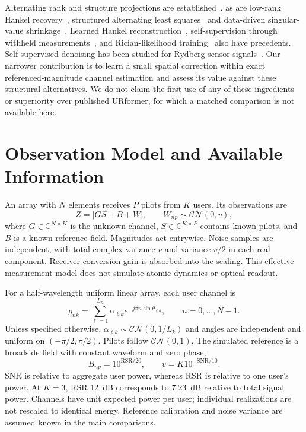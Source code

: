 \documentclass[10pt,journal,letterpaper]{IEEEtran}
\newcommand{\CN}{\mathcal{CN}}
\begin{document}
Alternating rank and structure projections are established~\cite{cadzow1988}, as are low-rank Hankel recovery~\cite{chen2014emac,yin2021}, structured alternating least squares~\cite{zachariah2012} and data-driven singular-value shrinkage~\cite{nadakuditi2014}. Learned Hankel reconstruction~\cite{huang2021}, self-supervision through withheld measurements~\cite{yaman2020,luo2023}, and Rician-likelihood training~\cite{parker2023} also have precedents. Self-supervised denoising has been studied for Rydberg sensor signals~\cite{liu2026}. Our narrower contribution is to learn a small spatial correction within exact referenced-magnitude channel estimation and assess its value against these structural alternatives. We do not claim the first use of any of these ingredients or superiority over published URformer, for which a matched comparison is not available here.

\section{Observation Model and Available Information}
\label{sec:model}
An array with $N$ elements receives $P$ pilots from $K$ users. Its observations are
\begin{equation}
 Z=|GS+B+W|,\qquad W_{np}\sim\CN(0,v),
 \label{eq:model}
\end{equation}
where $G\in\mathbb C^{N\times K}$ is the unknown channel, $S\in\mathbb C^{K\times P}$ contains known pilots, and $B$ is a known reference field. Magnitudes act entrywise. Noise samples are independent, with total complex variance $v$ and variance $v/2$ in each real component. Receiver conversion gain is absorbed into the scaling. This effective measurement model does not simulate atomic dynamics or optical readout.

For a half-wavelength uniform linear array, each user channel is
\begin{equation}
 g_{nk}=\sum_{\ell=1}^{L_k}\alpha_{\ell k}e^{-j\pi n\sin\theta_{\ell k}},
 \qquad n=0,\ldots,N-1.
 \label{eq:channel}
\end{equation}
Unless specified otherwise, $\alpha_{\ell k}\sim\CN(0,1/L_k)$ and angles are independent and uniform on $(-\pi/2,\pi/2)$. Pilots follow $\CN(0,1)$. The simulated reference is a broadside field with constant waveform and zero phase,
\begin{equation}
 B_{np}=10^{\mathrm{RSR}/20},\qquad v=K10^{-\mathrm{SNR}/10}.
\end{equation}
SNR is relative to aggregate user power, whereas RSR is relative to one user's power. At $K=3$, RSR 12~dB corresponds to 7.23~dB relative to total signal power. Channels have unit expected power per user; individual realizations are not rescaled to identical energy. Reference calibration and noise variance are assumed known in the main comparisons.
\end{document}
